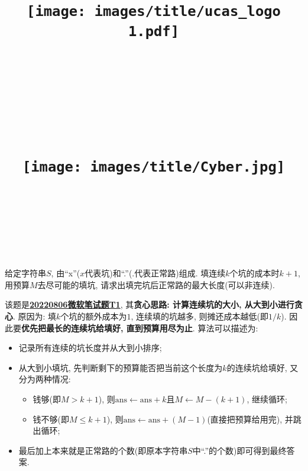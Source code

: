 \documentclass{article}
\title{
	\texttt{[image: images/title/ucas\_logo 1.pdf]}\\
    \vspace{1in}
    \textmd{\textbf{\hmwkClass}}\\
	\textmd{\Large{\textbf{\hmwkClassID}}}\\
    \textmd{\textbf{\hmwkTitle}}\\
    \normalsize\vspace{0.1in}\large{\hmwkCompleteTime }\\
    \vspace{0.1in}\large{\textit{\hmwkClassInstructor\ }}\\
    \vspace{1in}
	\texttt{[image: images/title/Cyber.jpg]}\\
	\vspace{1in}
}
\author{
	\hmwkAuthorName \\ 
	\hmwkAuthorStuID \\
	\hmwkAuthorInst \\
	\hmwkAuthorzhuanye \\
	\hmwkAuthorfangxiang
	}
\date{}
\begin{document}
\maketitle


%
%
%
%
%





\begin{homeworkProblem}
    给定字符串$S$, 由“x”($x$代表坑)和“.”($.$代表正常路)组成. 填连续$k$个坑的成本时$k+1$, 用预算$M$去尽可能的填坑, 请求出填完坑后正常路的最大长度(可以非连续).

    \solution 该题是\href{https://blog.csdn.net/weixin_41896265/article/details/126219829}{\textbf{20220806微软笔试题T1}}, 其\textbf{贪心思路: 计算连续坑的大小, 从大到小进行贪心}. 原因为: 填$k$个坑的额外成本为$1$, 连续填的坑越多, 则摊还成本越低(即$1/k$). 因此要\textbf{优先把最长的连续坑给填好, 直到预算用尽为止}. 算法可以描述为:
    \begin{itemize}
        \item 记录所有连续的坑长度并从大到小排序;
        \item 从大到小填坑, 先判断剩下的预算能否把当前这个长度为$k$的连续坑给填好, 又分为两种情况:
        \begin{itemize}
            \item 钱够(即$M>k+1$), 则$\text{ans} \gets \text{ans}+k$且$M\gets M-(k+1)$, 继续循环;
            \item 钱不够(即$M\leq k+1$), 则$\text{ans} \gets \text{ans}+(M-1)$(直接把预算给用完), 并跳出循环;
        \end{itemize}
        \item 最后加上本来就是正常路的个数(即原本字符串$S$中“.”的个数)即可得到最终答案.
    \end{itemize}
    

\end{homeworkProblem}
\end{document}
